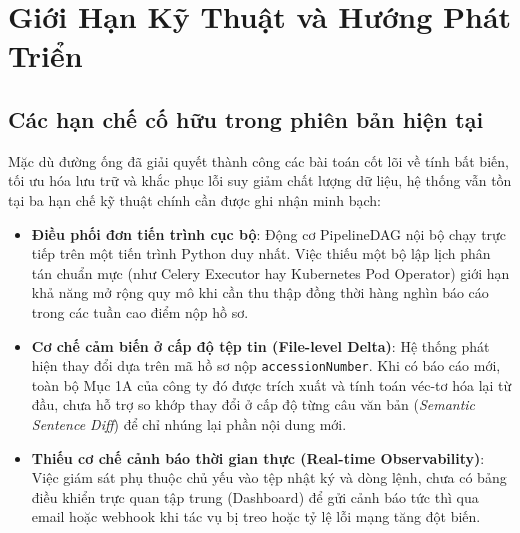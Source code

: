 \section{Giới Hạn Kỹ Thuật và Hướng Phát Triển}

\subsection{Các hạn chế cố hữu trong phiên bản hiện tại}
Mặc dù đường ống đã giải quyết thành công các bài toán cốt lõi về tính bất biến, tối ưu hóa lưu trữ và khắc phục lỗi suy giảm chất lượng dữ liệu, hệ thống vẫn tồn tại ba hạn chế kỹ thuật chính cần được ghi nhận minh bạch:
\begin{itemize}
    \item \textbf{Điều phối đơn tiến trình cục bộ}: Động cơ PipelineDAG nội bộ chạy trực tiếp trên một tiến trình Python duy nhất. Việc thiếu một bộ lập lịch phân tán chuẩn mực (như Celery Executor hay Kubernetes Pod Operator) giới hạn khả năng mở rộng quy mô khi cần thu thập đồng thời hàng nghìn báo cáo trong các tuần cao điểm nộp hồ sơ.
    \item \textbf{Cơ chế cảm biến ở cấp độ tệp tin (File-level Delta)}: Hệ thống phát hiện thay đổi dựa trên mã hồ sơ nộp \texttt{accessionNumber}. Khi có báo cáo mới, toàn bộ Mục 1A của công ty đó được trích xuất và tính toán véc-tơ hóa lại từ đầu, chưa hỗ trợ so khớp thay đổi ở cấp độ từng câu văn bản (\textit{Semantic Sentence Diff}) để chỉ nhúng lại phần nội dung mới.
    \item \textbf{Thiếu cơ chế cảnh báo thời gian thực (Real-time Observability)}: Việc giám sát phụ thuộc chủ yếu vào tệp nhật ký  và dòng lệnh, chưa có bảng điều khiển trực quan tập trung (Dashboard) để gửi cảnh báo tức thì qua email hoặc webhook khi tác vụ bị treo hoặc tỷ lệ lỗi mạng tăng đột biến.
\end{itemize}

